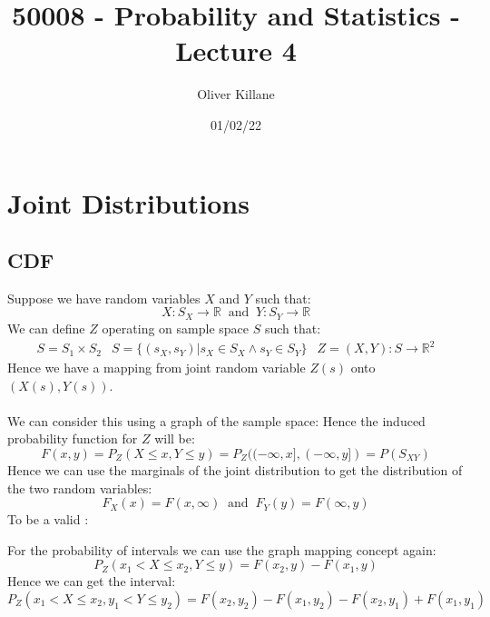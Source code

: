 \documentclass{report}
\title{50008 - Probability and Statistics - Lecture 4}
\author{Oliver Killane}
\date{01/02/22}
\begin{document}
    \maketitle
    
    \section{Joint Distributions}
        \subsection*{CDF}
            Suppose we have random variables $X$ and $Y$ such that:
            \[X: S_X \to \mathbb{R} \ \text{ and } \ Y: S_Y \to \mathbb{R}\]
            We can define $Z$ operating on sample space $S$ such that:
            \[\begin{matrix}
                S = S_1 \times S_2 & S = \{(s_X, s_Y) | s_X \in S_X \land s_Y \in S_Y\} & Z = (X, Y): S \to \mathbb{R}^2
            \end{matrix}\]
            Hence we have a mapping from joint random variable $Z(s)$ onto $(X(s), Y(s))$.
            \\
            \\ We can consider this using a graph of the sample space:
            Hence the induced probability function for $Z$ will be:
            \[F(x,y) = P_Z(X \leq x, Y \leq y) = P_Z((-\infty, x], (- \infty, y]) = P(S_{XY})\]
            Hence we can use the marginals of the joint distribution to get the distribution of the two random variables:
            \[F_X(x) = F(x, \infty) \ \text{ and } \ F_Y(y) = F(\infty, y)\]
            To be a valid :

            For the probability of intervals we can use the graph mapping concept again:
            \[P_Z(x_1 < X \leq x_2, Y \leq y) = F(x_2, y) - F(x_1, y)\]
            Hence we can get the interval:
            \[P_Z(x_1 < X \leq x_2, y_1 < Y \leq y_2) = F(x_2, y_2) - F(x_1, y_2) -F(x_2,y_1) + F(x_1,y_1)\]
        
\end{document}

